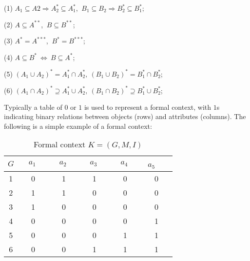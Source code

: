 \documentclass[11pt]{article}
\numberwithin{equation}{subsection}
\begin{document}
(1) $A_1\subseteq A2 \Rightarrow A^*_2 \subseteq A^*_1$, $\ B_1\subseteq B_2 \Rightarrow B^*_2\subseteq B^*_1$;

(2) $A \subseteq A^{**}$, $\ B \subseteq B^{**}$;

(3) $A^* = A^{***}$, $\ B^* = B^{***}$;

(4) $A \subseteq B^{*}\ \Leftrightarrow\ B \subseteq A^{*}$;

(5) $(A_1\cup A_2)^* = A^*_1\cap A^*_2, \ (B_1\cup B_2)^* = B^*_1\cap B^*_2$;

(6) $(A_1\cap A_2)^* \supseteq   A^*_1\cup A^*_2, \ (B_1\cap B_2)^* \supseteq B^*_1\cup B^*_2$;


Typically a  table of $0$ or $1$ is used to represent a formal context, with $1$s indicating binary relations between objects (rows) and attributes (columns). The following is a simple example of a formal context:



 \begin{table*}[ht]
            \begin{center}
                \begin{normalsize}
                    \caption{Formal context $K=(G, M, I)$}
                    \label{table_tab1}
                    \begin{tabular}
                        {|c|c c  c  c  c|}
                        \hline
                        $G$     & $\ \ \ \ a_1\ \ \ \ \ $       &  $\ \ \ \ a_2\ \ \ \ \ $  &  $\ \ \ \ a_3\ \ \ \ \ $  & $\ \ \ \ a_4\ \ \ \ \ $  &  $\ \ a_5$\ \ \  \\
                       \hline
 1 & 0   & 1  &  1  & 0 &  0  \\

 2 & 1  &  1  & 0 &  0  &  0   \\

 3 & 1   & 0 &  0  &  0  &  0   \\

4 & 0 &  0  &  0  &  0  &   1  \\

5 & 0 &  0  &  0  &  1 &   1  \\

6 & 0 &  0  &  1  &  1 &   1  \\
\hline
                    \end{tabular}
                \end{normalsize}
            \end{center}
        \end{table*}
\end{document}
